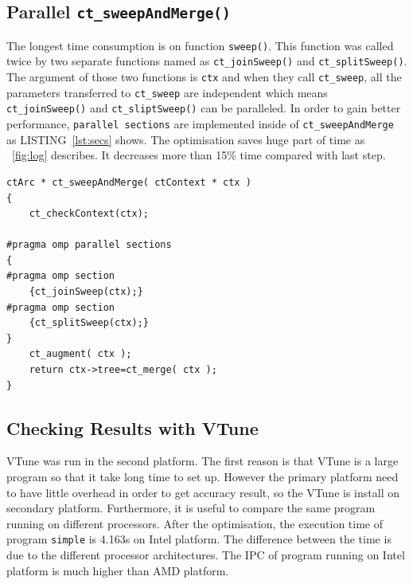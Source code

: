 \documentclass[conference]{IEEEtran}
\newcommand{\fref}[1]{\figurename~\ref{#1}}
\newcommand{\lref}[1]{LISTING~\ref{#1}}
\begin{document}
\subsection{Parallel \texttt{ct\_sweepAndMerge()}}
The longest time consumption is on function \texttt{sweep()}. This function was called twice by two separate functions named as \texttt{ct\_joinSweep()} and \texttt{ct\_splitSweep()}. The argument of those two functions is \texttt{ctx} and when they call \texttt{ct\_sweep}, all the parameters transferred to \texttt{ct\_sweep} are independent which means \texttt{ct\_joinSweep()} and \texttt{ct\_sliptSweep()} can be paralleled. In order to gain better performance, \texttt{parallel sections} are implemented inside of \texttt{ct\_sweepAndMerge} as \lref{lst:secs} shows. The optimisation saves huge part of time as \fref{fig:log} describes. It decreases more than 15\% time compared with last step. 
\begin{lstlisting}[caption={Data Load with SIMD Intrinsics},captionpos=b,label=lst:secs]
ctArc * ct_sweepAndMerge( ctContext * ctx )
{
	ct_checkContext(ctx);
	
#pragma omp parallel sections    
{    
#pragma omp section
    {ct_joinSweep(ctx);}
#pragma omp section
    {ct_splitSweep(ctx);}
}   
    ct_augment( ctx );
    return ctx->tree=ct_merge( ctx );
}
\end{lstlisting}


\subsection{Checking Results with VTune}
VTune was run in the second platform. The first reason is that VTune is a large program so that it take long time to set up. However the primary platform need to have little overhead in order to get accuracy result, so the VTune is install on secondary platform. Furthermore, it is useful to compare the same program running on different processors. After the optimisation, the execution time of program \texttt{simple} is 4.163s on Intel platform. The difference between the time is due to the different processor architectures. The IPC of program running on Intel platform is much higher than AMD platform. 
\end{document}
